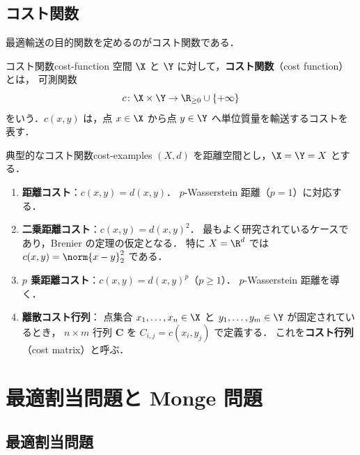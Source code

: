 \subsection{コスト関数}
\label{subsec:cost-function}

最適輸送の目的関数を定めるのがコスト関数である．

\begin{definition}{コスト関数}{cost-function}
  空間 $\X$ と $\Y$ に対して，\textbf{コスト関数}（cost function）とは，
  可測関数
  \[
    c \colon \X \times \Y \to \R_{\geq 0} \cup \{+\infty\}
  \]
  をいう．$c(x, y)$ は，点 $x \in \X$ から点 $y \in \Y$ へ単位質量を輸送するコストを表す．
\end{definition}

\begin{example}{典型的なコスト関数}{cost-examples}
  $(X, d)$ を距離空間とし，$\X = \Y = X$ とする．
  \begin{enumerate}
    \item \textbf{距離コスト}：$c(x, y) = d(x, y)$．
      $p$-Wasserstein 距離（$p=1$）に対応する．
    \item \textbf{二乗距離コスト}：$c(x, y) = d(x, y)^2$．
      最もよく研究されているケースであり，Brenier の定理の仮定となる．
      特に $X = \R^d$ では $c(x,y) = \norm{x-y}_2^2$ である．
    \item \textbf{$p$ 乗距離コスト}：$c(x, y) = d(x, y)^p$（$p \geq 1$）．
      $p$-Wasserstein 距離を導く．
    \item \textbf{離散コスト行列}：
      点集合 $x_1, \ldots, x_n \in \X$ と $y_1, \ldots, y_m \in \Y$ が固定されているとき，
      $n \times m$ 行列 $\mathbf{C}$ を $C_{i,j} = c(x_i, y_j)$ で定義する．
      これを\textbf{コスト行列}（cost matrix）と呼ぶ．
  \end{enumerate}
\end{example}

\section{最適割当問題と Monge 問題}
\label{sec:monge-overview}

\subsection{最適割当問題}
\label{subsec:assignment}

